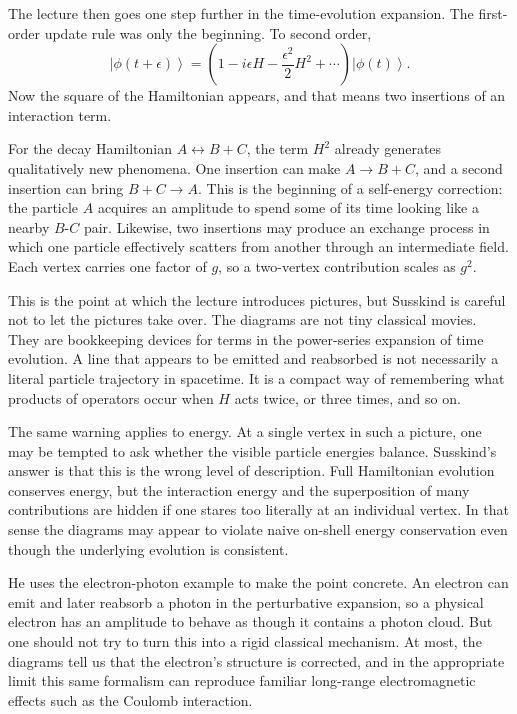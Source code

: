 The lecture then goes one step further in the time-evolution expansion. The first-order update rule was only the beginning. To second order,
\begin{equation}
\left|\phi(t+\epsilon)\right\rangle
=
\left(1-i\epsilon H-\frac{\epsilon^2}{2}H^2+\cdots\right)
\left|\phi(t)\right\rangle.
\end{equation}
Now the square of the Hamiltonian appears, and that means two insertions of an interaction term.

For the decay Hamiltonian \(A\leftrightarrow B+C\), the term \(H^2\) already generates qualitatively new phenomena. One insertion can make \(A\to B+C\), and a second insertion can bring \(B+C\to A\). This is the beginning of a self-energy correction: the particle \(A\) acquires an amplitude to spend some of its time looking like a nearby \(B\)-\(C\) pair. Likewise, two insertions may produce an exchange process in which one particle effectively scatters from another through an intermediate field. Each vertex carries one factor of \(g\), so a two-vertex contribution scales as \(g^2\).

This is the point at which the lecture introduces pictures, but Susskind is careful not to let the pictures take over. The diagrams are not tiny classical movies. They are bookkeeping devices for terms in the power-series expansion of time evolution. A line that appears to be emitted and reabsorbed is not necessarily a literal particle trajectory in spacetime. It is a compact way of remembering what products of operators occur when \(H\) acts twice, or three times, and so on.

The same warning applies to energy. At a single vertex in such a picture, one may be tempted to ask whether the visible particle energies balance. Susskind's answer is that this is the wrong level of description. Full Hamiltonian evolution conserves energy, but the interaction energy and the superposition of many contributions are hidden if one stares too literally at an individual vertex. In that sense the diagrams may appear to violate naive on-shell energy conservation even though the underlying evolution is consistent.

He uses the electron-photon example to make the point concrete. An electron can emit and later reabsorb a photon in the perturbative expansion, so a physical electron has an amplitude to behave as though it contains a photon cloud. But one should not try to turn this into a rigid classical mechanism. At most, the diagrams tell us that the electron's structure is corrected, and in the appropriate limit this same formalism can reproduce familiar long-range electromagnetic effects such as the Coulomb interaction.

